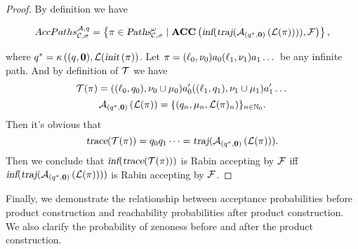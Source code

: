 \begin{proof}
By definition we have
\begin{small}
$$
    AccPaths _{\mathcal{C},\sigma} ^{\mathcal{A},q} = \left \{ 
        \pi \in \mbox{\sl Paths}^\omega_{\mathcal{C},\sigma} \mid 
        \mbox{\bf ACC} \left( {
            \mbox{\sl inf} (  
                \mbox{\sl traj} (  
                    {\mathcal{A}}_{\left(q^*,\mathbf{0}\right)}\left(\mathcal{L}(\pi)\right) 
                 )
             )
        }, {
            \mathcal{F}
        } \right)
    \right\},
$$
\end{small}
where
$
    q^*
        =
            \kappa \left(
                (q,\mathbf{0}), 
                \mathcal{L} (
                    \mbox{\sl init}\left(\pi\right)
            \right)
$.
Let $\pi = (\ell_0,\nu_0) a_0 (\ell_1,\nu_1) a_1 \dots $ be any infinite path.
And by definition of $\mathcal{T}$ we have
$$
    \mathcal{T}( \pi ) = 
        ((\ell_0,q_0),\nu_0\cup\mu_0)
        a'_0
        ((\ell_1,q_1),\nu_1\cup\mu_1)
        a'_1
        \dots 
$$
$$
    {\mathcal{A}}_{\left(q^*,\mathbf{0}\right)}\left(\mathcal{L}(\pi)\right) 
        = \{(q_n,\mu_n,\mathcal{L}(\pi)_{n})\}_{n\in\mathbb{N}_0}.
$$
Then it's obvious that
$$\mbox{\sl trace}(  \mathcal{T}( \pi )  )
    = q_0 q_1 \dots
    = \mbox{\sl traj} (  
        {\mathcal{A}}_{\left(q^*,\mathbf{0}\right)}\left(\mathcal{L}(\pi)\right) 
     ).
$$ 
Then we conclude that
$\mbox{\sl inf} ( 
    \mbox{\sl trace}( 
        \mathcal{T}( \pi )
     )
 )$
is Rabin accepting by $\mathcal{F}$ iff 
$
    \mbox{\sl inf} (  
        \mbox{\sl traj} (  
            {\mathcal{A}}_{\left(q^*,\mathbf{0}\right)}\left(\mathcal{L}(\pi)\right) 
         )
     )
$
is Rabin accepting by $\mathcal{F}$.
\end{proof}

Finally, we demonstrate the relationship between acceptance probabilities before product construction and reachability probabilities after product construction.
We also clarify the probability of zenoness before and after the product construction.

